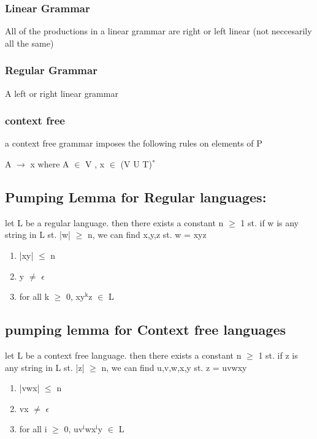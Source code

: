 \documentclass[11pt]{article}
\begin{document}
\subsubsection{Linear Grammar}
\label{sec-1-4-3}
All of the productions in a linear grammar are right or left linear (not neccesarily all the same)
\subsubsection{Regular Grammar}
\label{sec-1-4-4}
A left or right linear grammar
\subsubsection{context free}
\label{sec-1-4-5}
a context free grammar imposes the following rules on elements of P
\begin{center}
A $\rightarrow$ x where A $\in$ V , x $\in$ (V U T)$^{\text{*}}$
\end{center}

\subsection{Pumping Lemma for Regular languages:}
\label{sec-1-5}
let L be a regular language. then there exists a constant n $\ge$ 1 st. if w is any string in L st. |w| $\ge$ n, we can find x,y,z st. w = xyz
\begin{enumerate}
\item |xy| $\le$ n
\item y $\ne$ $\epsilon$
\item for all k $\ge$ 0, xy$^{\text{k}}$z $\in$ L
\end{enumerate}

\subsection{pumping lemma for Context free languages}
\label{sec-1-6}
let L be a context free language. then there exists a constant n $\ge$ 1 st. if z is any string in L st. |z| $\ge$ n, we can find u,v,w,x,y st. z = uvwxy
\begin{enumerate}
\item |vwx| $\le$ n
\item vx $\ne$ $\epsilon$
\item for all i $\ge$ 0, uv$^{\text{i}}$wx$^{\text{i}}$y $\in$ L
\end{enumerate}
\end{document}
